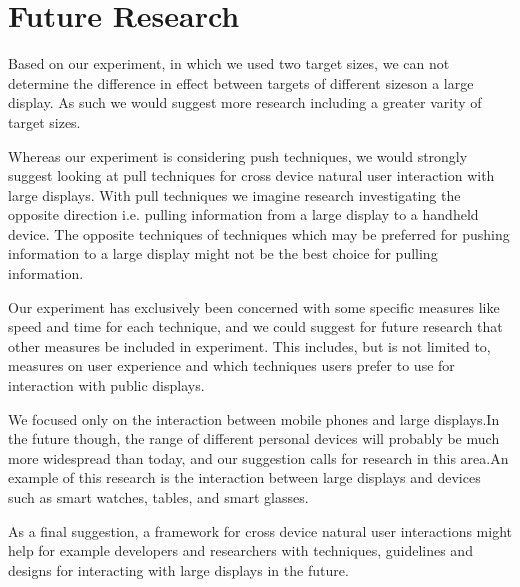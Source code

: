 \section{Future Research} \label{sec:futureresearch}
Based on our experiment, in which we used two target sizes, we can not determine the difference in effect between targets of different sizeson a large display. As such we would suggest more research including a greater varity of target sizes.

Whereas our experiment is considering push techniques, we would strongly suggest looking at pull techniques for cross device natural user interaction with large displays.
With pull techniques we imagine research investigating the opposite direction i.e. pulling information from a large display to a handheld device.
The opposite techniques of techniques which may be preferred for pushing information to a large display might not be the best choice for pulling information.

Our experiment has exclusively been concerned with some specific measures like speed and time for each technique, and we could suggest for future research that other measures be included in experiment.
This includes, but is not limited to, measures on user experience and which techniques users prefer to use for interaction with public displays.

We focused only on the interaction between mobile phones and large displays.In the future though, the range of different personal devices will probably be much more widespread than today, and our suggestion calls for research in this area.An example of this research is the interaction between large displays and devices such as smart watches, tables, and smart glasses.

As a final suggestion, a framework for cross device natural user interactions might help for example developers and researchers with techniques, guidelines and designs for interacting with large displays in the future.